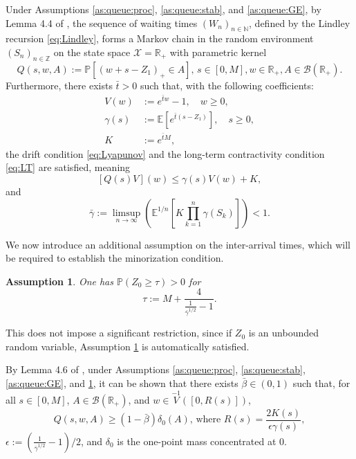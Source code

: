 \documentclass[a4paper,10pt]{article}
\newtheorem{assumption}[theorem]{Assumption}
\newcommand{\N}{\mathbb{N}}
\newcommand{\Z}{\mathbb{Z}}
\newcommand{\R}{\mathbb{R}}
\newcommand{\B}{\mathcal{B}}
\newcommand{\X}{\mathcal{X}}
\renewcommand{\P}{\mathbb{P}}
\newcommand{\E}{\mathbb{E}}
\newcommand{\ga}{\gamma}
\begin{document}
Under Assumptions \ref{as:queue:proc}, \ref{as:queue:stab}, and \ref{as:queue:GE}, by Lemma 4.4 of \cite{lovas}, the sequence of waiting times $(W_n)_{n\in\N}$, defined by the Lindley recursion \eqref{eq:Lindley}, forms a Markov chain in the random environment $(S_n)_{n\in\Z}$ on the state space $\X = \R_{+}$ with parametric kernel
\begin{equation*}
	Q(s, w, A) := \P \left[\left(w + s - Z_1\right)_+ \in A\right], \,
	s \in [0, M], w \in \R_{+}, A \in \B\left(\R_{+}\right).
\end{equation*}
Furthermore, there exists $\bar{t} > 0$ such that, with the following coefficients:
\begin{align*}
	V(w)    &:= e^{\bar{t}w} - 1, \quad w \ge 0,\\	
	\gamma(s) &:= \E\left[e^{\bar{t}(s - Z_1)}\right], \quad s \ge 0,\\
	K       &:= e^{\bar{t}M},
\end{align*}
the drift condition \eqref{eq:Lyapunov} and the long-term contractivity condition \eqref{eq:LT} are satisfied, meaning
$$
[Q(s)V](w) \le \gamma(s)V(w) + K,
$$
and
\begin{equation*}
	\bar{\gamma} := \limsup_{n \to \infty} \left( \E^{1/n} \left[K \prod_{k=1}^{n} \gamma(S_k)\right] \right) < 1.
\end{equation*}

We now introduce an additional assumption on the inter-arrival times, which will be required to establish the minorization condition.
\begin{assumption}\label{as:queue:minor}
	One has $\P \left(Z_0\ge\tau\right)>0$ for $$
	\tau:=M+\frac{4}{\frac{1}{\bar{\ga}^{1/2}}-1}.
	$$
\end{assumption}	
This does not impose a significant restriction, since if $Z_0$ is an unbounded random variable, Assumption \ref{as:queue:minor} is automatically satisfied.

By Lemma 4.6 of \cite{lovas}, under Assumptions \ref{as:queue:proc}, \ref{as:queue:stab}, \ref{as:queue:GE}, and \ref{as:queue:minor}, it can be shown that
there exists $\bar{\beta} \in (0,1)$ such that, for all $s \in [0,M]$, $A \in \B\left(\R_{+}\right)$, and $w \in \stackrel{-1}{V}([0,R(s)])$,
\begin{equation}\label{eq:old_minor}
Q(s, w, A) \ge (1 - \bar{\beta}) \delta_0 (A), \,
\text{where } R(s) = \frac{2 K(s)}{\epsilon \gamma(s)},
\end{equation}
$\epsilon := \left(\frac{1}{\bar{\gamma}^{1/2}} - 1\right)/2$, and $\delta_0$ is the one-point mass concentrated at 0.
\end{document}
